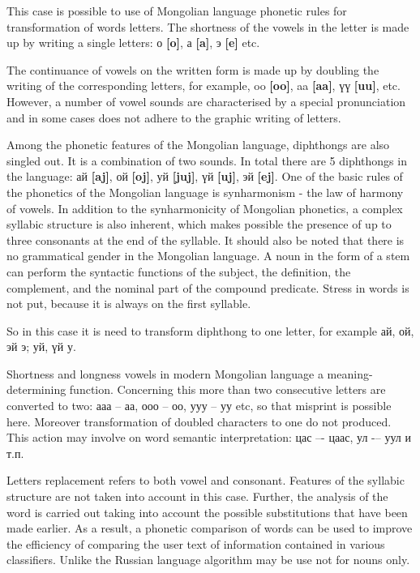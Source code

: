 \documentclass[conference,a4paper]{IEEEtran}
\begin{document}
This case is possible to use of Mongolian language phonetic rules for transformation of words letters. The shortness of the vowels in the letter is made up by writing a single letters: о \textbf{[o]}, а \textbf{[a]}, э \textbf{[e]} etc. 

The continuance of vowels on the written form is made up by doubling the writing of the corresponding letters, for example, oo \textbf{[oo]}, aa \textbf{[aa]}, үү \textbf{[uu]}, etc. However, a number of vowel sounds are characterised by a special pronunciation and in some cases does not adhere to the graphic writing of letters.

Among the phonetic features of the Mongolian language, diphthongs are also singled out. It is a combination of two sounds. In total there are 5 diphthongs in the language: ай \textbf{[aj]}, ой \textbf{[oj]}, уй \textbf{[juj]}, үй \textbf{[uj]}, эй \textbf{[ej]}. One of the basic rules of the phonetics of the Mongolian language is synharmonism - the law of harmony of vowels. In addition to the synharmonicity of Mongolian phonetics, a complex syllabic structure is also inherent, which makes possible the presence of up to three consonants at the end of the syllable. It should also be noted that there is no grammatical gender in the Mongolian language. A noun in the form of a stem can perform the syntactic functions of the subject, the definition, the complement, and the nominal part of the compound predicate. Stress in words is not put, because it is always on the first syllable.

So in this case it is need to transform diphthong to one letter, for example ай, ой, эй \rightarrow э; уй, үй \rightarrow у.

Shortness and longness vowels in modern Mongolian language a meaning-determining function. Concerning this more than two consecutive letters are converted to two: ааа -- аа, ооо -- оо, ууу -- уу etc, so that misprint is possible here. Moreover transformation of doubled characters to one do not produced. This action may involve on word semantic interpretation: цас –- цаас, ул -– уул и т.п. 

Letters replacement refers to both vowel and consonant. Features of the syllabic structure are not taken into account in this case.
Further, the analysis of the word is carried out taking into account the possible substitutions that have been made earlier. As a result, a phonetic comparison of words can be used to improve the efficiency of comparing the user text of information contained in various classifiers. Unlike the Russian language algorithm may be use not for nouns only.
\end{document}
